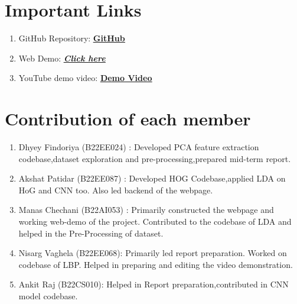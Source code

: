 \documentclass[a4paper]{article}
\theoremstyle{plain}
\theoremstyle{definition}
\begin{document}
\section{Important Links }
\begin{enumerate}
    \item GitHub Repository: \href{https://github.com/dhyeyinf/Face_Identification}{\textbf{\underline {\color{blue}GitHub}}}
    \item Web Demo: \href{http://172.31.8.157:5000/}{\textbf{\textit{\underline {\color{blue}Click here}}}}
    \item YouTube demo video: \color{blue} \href{https://youtu.be/rYlWvNh9VCs}{\underline {\textbf{Demo Video}}}



\end{enumerate}
	

	
	
	
	\appendix 
 \vfill
	
	\section{Contribution of each member}
	\label{sec:contribution}
	\begin{enumerate}
	\item Dhyey Findoriya (B22EE024) : Developed PCA feature extraction codebase,dataset exploration and pre-processing,prepared mid-term report.
	\item Akshat Patidar (B22EE087) : Developed HOG Codebase,applied LDA on HoG and CNN too. Also led backend of the webpage.
 \item 	 Manas Chechani (B22AI053) : Primarily constructed the webpage and working web-demo of the project. Contributed to the codebase of LDA and helped in the Pre-Processing of dataset.
 \item Nisarg Vaghela (B22EE068): Primarily led report preparation. Worked on codebase of LBP. Helped in preparing and editing the video demonstration.
 \item Ankit Raj (B22CS010):  Helped in Report preparation,contributed in CNN model codebase.
	
	\end{enumerate}
    	
\end{document}
